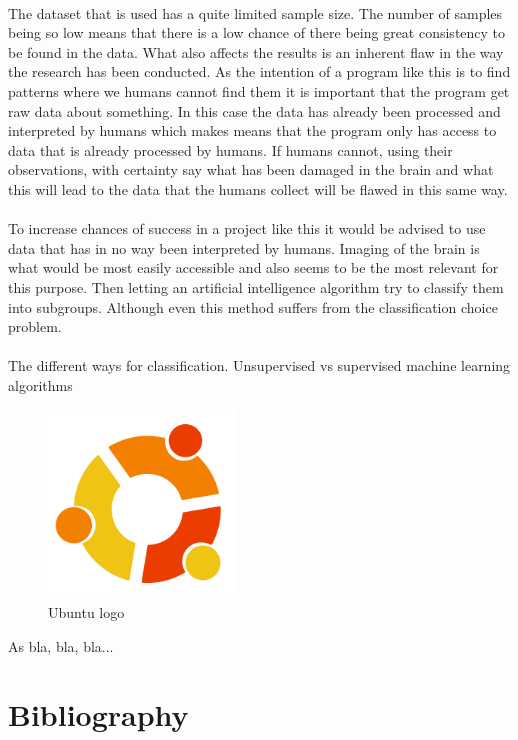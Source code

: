 \documentclass[11pt]{article}
\begin{document}
\\
The dataset that is used has a quite limited sample size. The number of samples being so low means that there is a low chance of there being great consistency to be found in the data. What also affects the results is an inherent flaw in the way the research has been conducted. As the intention of a program like this is to find patterns where we humans cannot find them it is important that the program get raw data about something. In this case the data has already been processed and interpreted by humans which makes means that the program only has access to data that is already processed by humans. If humans cannot, using their observations, with certainty say what has been damaged in the brain and what this will lead to the data that the humans collect will be flawed in this same way.\\
\\
To increase chances of success in a project like this it would be advised to use data that has in no way been interpreted by humans. Imaging of the brain is what would be most easily accessible and also seems to be the most relevant for this purpose. Then letting an artificial intelligence algorithm try to classify them into subgroups. Although even this method suffers from the classification choice problem.\\
\\
The different ways for classification. Unsupervised vs supervised machine learning algorithms

\begin{figure}[h]
  \centering
  \includegraphics[width=5cm]{graphics/ubuntu.png}
  \caption{Ubuntu logo}
\end{figure}

As \cite{FeatureSelection2020} bla, bla, bla...\\

\section{Bibliography}

\printbibliography
\end{document}
